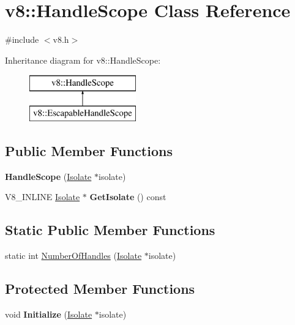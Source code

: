 \hypertarget{classv8_1_1_handle_scope}{}\section{v8\+:\+:Handle\+Scope Class Reference}
\label{classv8_1_1_handle_scope}


{\ttfamily \#include $<$v8.\+h$>$}

Inheritance diagram for v8\+:\+:Handle\+Scope\+:\begin{figure}[H]
\begin{center}
\leavevmode
\includegraphics[height=2.000000cm]{classv8_1_1_handle_scope}
\end{center}
\end{figure}
\subsection*{Public Member Functions}
\begin{DoxyCompactItemize}
\item 
{\bfseries Handle\+Scope} (\hyperlink{classv8_1_1_isolate}{Isolate} $\ast$isolate)\hypertarget{classv8_1_1_handle_scope_afdb3053d852ea467f026b025ed431e79}{}\label{classv8_1_1_handle_scope_afdb3053d852ea467f026b025ed431e79}

\item 
V8\+\_\+\+I\+N\+L\+I\+NE \hyperlink{classv8_1_1_isolate}{Isolate} $\ast$ {\bfseries Get\+Isolate} () const \hypertarget{classv8_1_1_handle_scope_a15d1a1e76d8cd8a10d3947c3ca2e8a8d}{}\label{classv8_1_1_handle_scope_a15d1a1e76d8cd8a10d3947c3ca2e8a8d}

\end{DoxyCompactItemize}
\subsection*{Static Public Member Functions}
\begin{DoxyCompactItemize}
\item 
static int \hyperlink{classv8_1_1_handle_scope_aac722821557f314a9cbe6b8ed8fc9d01}{Number\+Of\+Handles} (\hyperlink{classv8_1_1_isolate}{Isolate} $\ast$isolate)
\end{DoxyCompactItemize}
\subsection*{Protected Member Functions}
\begin{DoxyCompactItemize}
\item 
void {\bfseries Initialize} (\hyperlink{classv8_1_1_isolate}{Isolate} $\ast$isolate)\hypertarget{classv8_1_1_handle_scope_a7bb8631c1c8756b05e9232b8414dd992}{}\label{classv8_1_1_handle_scope_a7bb8631c1c8756b05e9232b8414dd992}

\end{DoxyCompactItemize}
